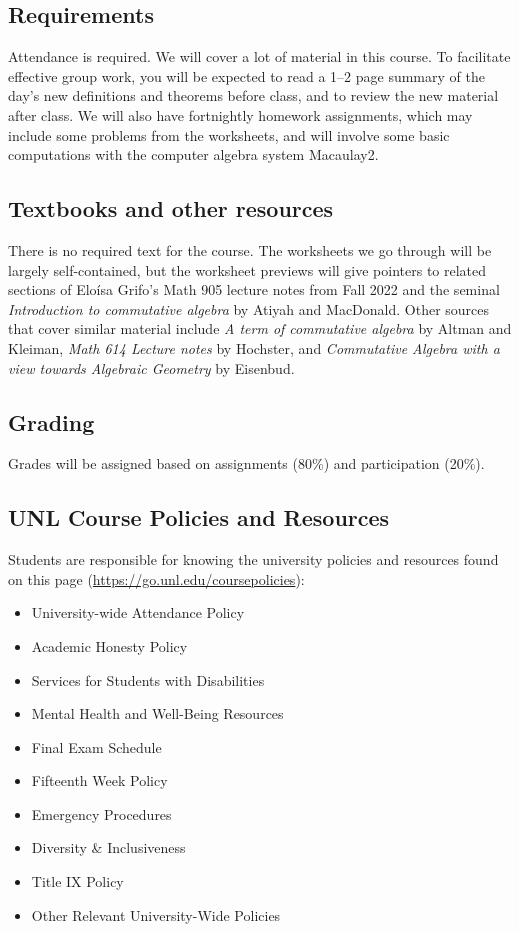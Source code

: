 \documentclass[12pt]{amsart}
\begin{document}
	\subsection*{Requirements} Attendance is required.
	We will cover a lot of material in this course. To facilitate effective group work, you will be expected to read a 1--2 page summary of the day's new definitions and theorems before class, and to review the new material after class. We will also have fortnightly homework assignments, which may include some problems from the worksheets, and will involve some basic computations with the computer algebra system Macaulay2.

	\subsection*{Textbooks and other resources} There is no required text for the course. The worksheets we go through will be largely self-contained, but the worksheet previews will give pointers to related sections of Elo\'isa Grifo's Math 905 lecture notes from Fall 2022  and the seminal \emph{Introduction to commutative algebra} by Atiyah and MacDonald. Other sources that cover similar material include \emph{A term of commutative algebra} by Altman and Kleiman,  \emph{Math 614 Lecture notes} by Hochster, and \emph{Commutative Algebra with a view towards Algebraic Geometry} by Eisenbud. 
		
	
\subsection*{Grading} Grades will be assigned based on assignments (80\%) and participation (20\%).


\subsection*{UNL Course Policies and Resources}
Students are responsible for knowing the university policies and resources found on this page (\url{https://go.unl.edu/coursepolicies}):
 \begin{multicols}{2}
 \begin{itemize}
\item University-wide Attendance Policy
\item Academic Honesty Policy
\item Services for Students with Disabilities
\item Mental Health and Well-Being Resources
\item Final Exam Schedule 
\item Fifteenth Week Policy 
\item Emergency Procedures 
\item Diversity \& Inclusiveness 
\item Title IX Policy 
\item Other Relevant University-Wide Policies
\end{itemize} 
\end{multicols}
\end{document}
